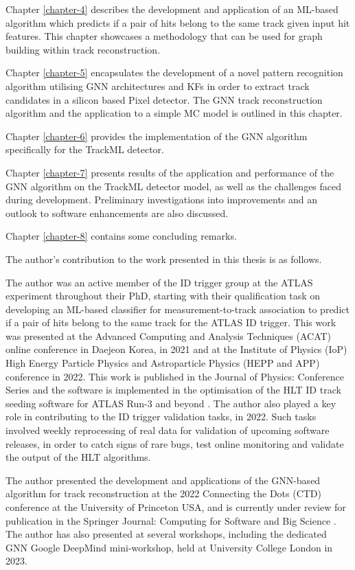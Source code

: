 Chapter \ref{chapter-4} describes the development and application of an ML-based algorithm which predicts if a pair of hits belong to the same track given input hit features. This chapter showcases a methodology that can be used for graph building within track reconstruction.

Chapter \ref{chapter-5} encapsulates the development of a novel pattern recognition algorithm utilising \acs{GNN} architectures and \ac{KF}s in order to extract track candidates in a silicon based Pixel detector. The \acs{GNN} track reconstruction algorithm and the application to a simple \ac{MC} model is outlined in this chapter.

Chapter \ref{chapter-6} provides the implementation of the \acs{GNN} algorithm specifically for the TrackML detector.

Chapter \ref{chapter-7} presents results of the application and performance of the \acs{GNN} algorithm on the TrackML detector model, as well as the challenges faced during development. Preliminary investigations into improvements and an outlook to software enhancements are also discussed.

Chapter \ref{chapter-8} contains some concluding remarks.

The author’s contribution to the work presented in this thesis is as follows.

The author was an active member of the \ac{ID} trigger group at the ATLAS experiment throughout their PhD, starting with their qualification task on developing an ML-based classifier for measurement-to-track association to predict if a pair of hits belong to the same track for the ATLAS ID trigger. This work was presented at the Advanced Computing and Analysis Techniques (ACAT) online conference in Daejeon Korea, in 2021 and at the Institute of Physics (IoP) High Energy Particle Physics and Astroparticle Physics (HEPP and APP) conference in 2022. This work is published in the Journal of Physics: Conference Series \cite{Lad_2023} and the software is implemented in the optimisation of the \ac{HLT} ID track seeding software for ATLAS Run-3 and beyond \cite{Grandi:2728111, Long:2813981}. The author also played a key role in contributing to the ID trigger validation tasks, in 2022. Such tasks involved weekly reprocessing of real data for validation of upcoming software releases, in order to catch signs of rare bugs, test online monitoring and validate the output of the \ac{HLT} algorithms.

The author presented the development and applications of the GNN-based algorithm for track reconstruction at the 2022 Connecting the Dots (CTD) conference at the University of Princeton USA, and is currently under review for publication in the Springer Journal: Computing for Software and Big Science \cite{Lad_2023_gnn}. The author has also presented at several workshops, including the dedicated \acs{GNN} Google DeepMind mini-workshop, held at University College London in 2023.

